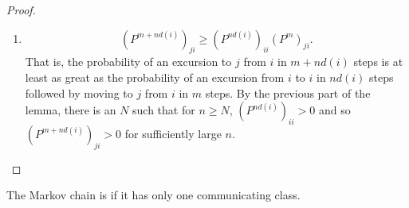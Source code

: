 \documentclass[12pt]{article}
\begin{document}
\begin{proof}
\begin{enumerate}
\begin{enumerate}
\[                        (P^{n_j})_{ii} = (P^{m_{ij} + m_{ji}})_{ii} \ge
                        (P^{m_{ij}})_{ij } (P^{m_{ji}})_{ji} > 0.
                    \] That is, the probability of a return to \( i \)
                    from \( i \) in \( n_j \) steps is at least as great
                    as the probability of an excursion from \( i \) to \(
                    j \) in \( m_{ij} \) steps with return to \( i \)
                    from \( j \) in \( m_{ji} \) steps.
                \item
                    Next note that if \( (P^{n_j})_{ii} > 0 \) implies
                    that for any positive integer \( c_j \), \( (P^{c_j
                    n_j})_ {ii} > 0 \), that is, the probability of \( c_j
                    \) sequential returns is still positive.

                    Should assert here that \( d(i) \) is the \( \gcd(n_1,
                    \dots, n_k) \).  (Note:  Certainly by the previous, \(
                    d(i) \) is a divisor, but is it the greatest?)
                \item
                    By the number theoretic Lemma~%
                    \ref{lem:stationarydistributions:numtheory}, there
                    exists \( N \) and positive integers \( c_1, \dots,
                    c_k \) such that if \( n \ge N \)
                    \[
                        (P^{n d(i)})_{ii} = (P^{c_1 n_1 + \dots c_k n_k})_
                        {ii} \ge (P^{c_1 n_1})_{ii} \cdot \dots \cdot (P^
                        {c_k n_k})_{ii} >0.
                    \]
            \end{enumerate}
        \item
            \[
                (P^{m + n d(i)})_{ji} \ge (P^{n d(i)})_{ii} (P^m)_{ji}.
            \] That is, the probability of an excursion to \( j \) from \(
            i \) in \( m + n d(i) \) steps is at least as great as the
            probability of an excursion from \( i \) to \( i \) in \( n
            d(i) \) steps followed by moving to \( j \) from \( i \) in \(
            m \) steps.  By the previous part of the lemma, there is an \(
            N \) such that for \( n \ge N \), \( (P^{n d(i)})_{ii} > 0 \)
            and so \( (P^{m + n d(i)})_{ji} >0 \) for sufficiently large
            \( n \).
    \end{enumerate}
\end{proof}

\begin{definition}
    The Markov chain is  if it has only one
    communicating class.
\end{definition}
\end{document}
